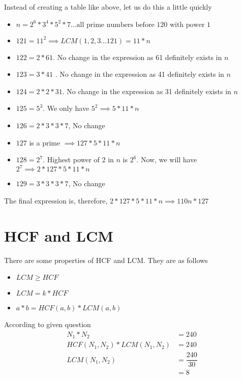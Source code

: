 
Instead of creating a table like above, let us do this a little quickly
\begin{itemize}
    \item $n = 2^6 * 3^4 * 5^2 * 7 \ldots \text{all prime numbers before 120 with power 1}$
    \item $121 = 11^2 \implies LCM(1,2,3 \ldots 121) = 11 * n$
    \item $122 = 2 * 61$. No change in the expression as 61 definitely exists in $n$
    \item $123 = 3 * 41$ . No change in the expression as 41 definitely exists in $n$
    \item $124 = 2 * 2 * 31$. No change in the expression as 31 definitely exists in $n$
    \item $125 = 5^3$. We only have $5^2 \implies 5 * 11 * n$ 
    \item $126 = 2 * 3 * 3 * 7$, No change
    \item $127$ is a prime $\implies 127 * 5 * 11 * n$
    \item $128 = 2^7$. Highest power of 2 in $n$ is $2^6$. Now, we will have $2^7 \implies 2 * 127 * 5 * 11 * n$
    \item $129 = 3 * 3 * 3 * 7$, No change
\end{itemize}

The final expression is, therefore, $2 * 127 *  5 * 11 * n \implies 110n * 127$

\section{HCF and LCM}
There are some properties of HCF and LCM. They are as follows
\begin{itemize}
    \item $LCM \geq HCF$
    \item $LCM = k * HCF$
    \item $a * b = HCF(a,b) * LCM(a,b)$
\end{itemize}

According to given question
\begin{align*}
    N_1 * N_2 &= 240 \\
    HCF(N_1,N_2) * LCM(N_1,N_2) &= 240 \\
    LCM(N_1,N_2) &= \dfrac{240}{30} \\
    &= 8
\end{align*}

